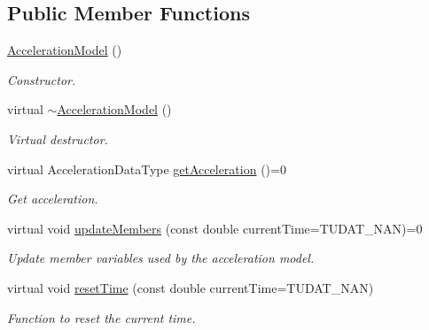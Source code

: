 \subsection*{Public Member Functions}
\begin{DoxyCompactItemize}
\item 
\hyperlink{classtudat_1_1basic__astrodynamics_1_1AccelerationModel_a36f72cf81cc4ff658919a1b92cdc33ad}{Acceleration\+Model} ()\hypertarget{classtudat_1_1basic__astrodynamics_1_1AccelerationModel_a36f72cf81cc4ff658919a1b92cdc33ad}{}\label{classtudat_1_1basic__astrodynamics_1_1AccelerationModel_a36f72cf81cc4ff658919a1b92cdc33ad}

\begin{DoxyCompactList}\small\item\em Constructor. \end{DoxyCompactList}\item 
virtual \hyperlink{classtudat_1_1basic__astrodynamics_1_1AccelerationModel_a131bb0f8b79b410810f602d9b8865968}{$\sim$\+Acceleration\+Model} ()
\begin{DoxyCompactList}\small\item\em Virtual destructor. \end{DoxyCompactList}\item 
virtual Acceleration\+Data\+Type \hyperlink{classtudat_1_1basic__astrodynamics_1_1AccelerationModel_a1f59960bc477fc02e7d52697ced99750}{get\+Acceleration} ()=0
\begin{DoxyCompactList}\small\item\em Get acceleration. \end{DoxyCompactList}\item 
virtual void \hyperlink{classtudat_1_1basic__astrodynamics_1_1AccelerationModel_a966e85b72300b8cbc99ba60e40108d71}{update\+Members} (const double current\+Time=T\+U\+D\+A\+T\+\_\+\+N\+AN)=0
\begin{DoxyCompactList}\small\item\em Update member variables used by the acceleration model. \end{DoxyCompactList}\item 
virtual void \hyperlink{classtudat_1_1basic__astrodynamics_1_1AccelerationModel_a325aae81896137d88b756aac15e188da}{reset\+Time} (const double current\+Time=T\+U\+D\+A\+T\+\_\+\+N\+AN)
\begin{DoxyCompactList}\small\item\em Function to reset the current time. \end{DoxyCompactList}\end{DoxyCompactItemize}
